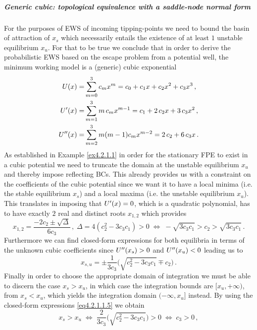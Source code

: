 \documentclass[../main.tex]{subfiles}
\begin{document}
\subparagraph{Generic cubic: topological equivalence with a saddle-node normal form}
For the purposes of EWS of incoming tipping-points we need to bound the basin of attraction of $x_{s}$ which necessarily entails the existence of at least $1$ unstable equilibrium $x_{u}$.
For that to be true we conclude that in order to derive the probabilistic EWS based on the escape problem from a potential well, the minimum working model is a (generic) cubic exponential
\begin{align*}
     U(x)            =& \sum_{m=0}^{3}c_{m}x^{m} = c_{0} + c_{1}x + c_{2}x^{2} + c_{3}x^{3}\,, \\
     U'(x) =& \sum_{m=1}^{3}m\,c_{m}x^{m-1} = c_{1} + 2\,c_{2}x + 3\,c_{3}x^{2} \,, \\ 
     U''(x) =& \sum_{m=2}^{3}m(m-1)c_{m}x^{m-2} = 2\,c_{2} + 6\,c_{3}x\,.
\end{align*}
As established in Example \ref{ex4.2.1.1} in order for the stationary FPE to exist in a cubic potential we need to truncate the domain at the unstable equilibrium $x_{u}$ and thereby impose reflecting BCs.
This already provides us with a constraint on the coefficients of the cubic potential since we want it to have a local minima (i.e. the stable equilibrium $x_{s}$) and a local maxima (i.e. the unstable equilibrium $x_{u}$).
This translates in imposing that $U'(x)=0$, which is a quadratic polynomial, has to have exactly $2$ real and distinct roots $x_{1,2}$ which provides
\begin{equation}\label{eq4.2.1.1.4}
        x_{1,2}=\frac{-2c_{2}\pm\sqrt{\Delta}}{6c_{3}}\,,\;\Delta = 4(c_{2}^{2}-3c_{3}c_{1})>0\;\iff\;-\sqrt{3c_{3}c_{1}}>c_{2}>\sqrt{3c_{3}c_{1}}\,.
\end{equation}
Furthermore we can find closed-form expressions for both equilibria in terms of the unknown cubic coefficients since $U''(x_{s})>0$ and $U''(x_{u})<0$ leading us to
\begin{equation}\label{eq4.2.1.1.5}
        x_{s,u} = \pm \frac{1}{3c_{3}}\Big(\sqrt{c_{2}^{2}-3 c_{3}c_{1}}\mp c_{2}\Big)\,.
\end{equation}
Finally in order to choose the appropriate domain of integration we must be able to discern the case $x_{s}>x_{u}$, in which case the integration bounds are $[x_{u},+\infty)$, from $x_{s}<x_{u}$, which yields the integration domain $(-\infty,x_{u}]$ instead.
By using the closed-form expressions \eqref{eq4.2.1.1.5} we obtain
\begin{equation}\label{eq4.2.1.1.6}
        x_{s}>x_{u}\;\iff\;\frac{2}{3c_{3}}\Big(\sqrt{c_{2}^{2}-3c_{3}c_{1}}\Big)>0\;\iff\;c_{3}>0\,, 
\end{equation}
\end{document}
